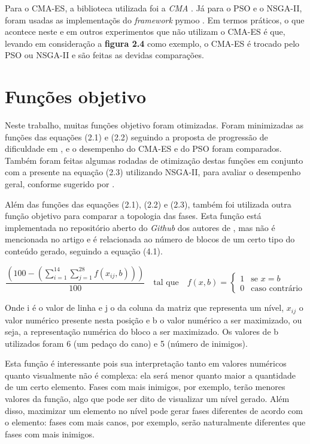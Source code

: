 Para o CMA-ES, a biblioteca utilizada foi a \textit{CMA} \cite{cma}. Já para o PSO e o NSGA-II, foram usadas as implementaçõs do \textit{framework} pymoo \cite{pymoo}. Em termos práticos, o que acontece neste e em outros experimentos que não utilizam o CMA-ES é que, levando em consideração a \textbf{figura 2.4} como exemplo, o CMA-ES é trocado pelo PSO ou NSGA-II e são feitas as devidas comparações.

\section{Funções objetivo}

Neste trabalho, muitas funções objetivo foram otimizadas. Foram minimizadas as funções das equações (2.1) e (2.2) seguindo a proposta de progressão de dificuldade em \cite{marioGAN}, e o desempenho do CMA-ES e do PSO foram comparados. Também foram feitas algumas rodadas de otimização destas funções em conjunto com a presente na equação (2.3) utilizando NSGA-II, para avaliar o desempenho geral, conforme sugerido por \cite{marioGAN}. 

Além das funções das equações (2.1), (2.2) e (2.3), também foi utilizada outra função objetivo para comparar a topologia das fases. Esta função está implementada no repositório aberto do \textit{Github} dos autores de \cite{marioGAN}, mas não é mencionada no artigo e é relacionada ao número de blocos de um certo tipo do conteúdo gerado, seguindo a equação (4.1).

\begin{equation}
    \frac{(100 - (\sum_{i=1}^{14} \sum_{j=1}^{28} f(x_{ij}, b)))}{100} \quad \text{tal que} \quad f(x,b) =
    \begin{cases}
        1 & \text{se } x = b \\
        0 & \text{caso contrário}
    \end{cases}
\end{equation}


Onde i é o valor de linha e j o da coluna da matriz que representa um nível, $x_{ij}$ o valor numérico presente nesta posição e b o valor numérico a ser maximizado, ou seja, a representação numérica do bloco a ser maximizado. Os valores de b utilizados foram 6 (um pedaço do cano) e 5 (número de inimigos).

Esta função é interessante pois sua interpretação tanto em valores numéricos quanto visualmente não é complexa: ela será menor quanto maior a quantidade de um certo elemento. Fases com mais inimigos, por exemplo, terão menores valores da função, algo que pode ser dito de visualizar um nível gerado. Além disso, maximizar um elemento no nível pode gerar fases diferentes de acordo com o elemento: fases com mais canos, por exemplo, serão naturalmente diferentes que fases com mais inimigos. 

